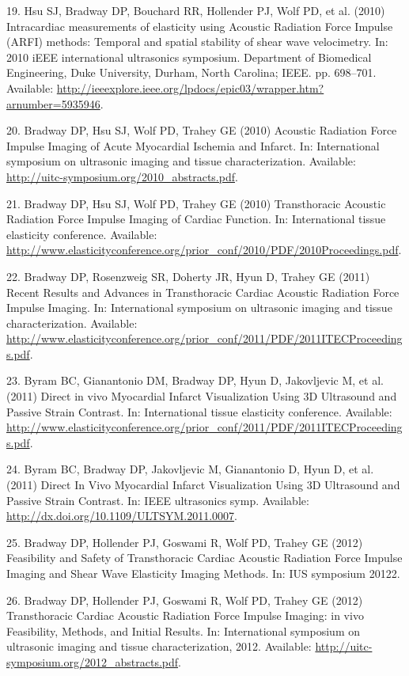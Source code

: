 \documentclass[]{article}
\begin{document}
19. Hsu SJ, Bradway DP, Bouchard RR, Hollender PJ, Wolf PD, et al.
(2010) Intracardiac measurements of elasticity using Acoustic Radiation
Force Impulse (ARFI) methods: Temporal and spatial stability of shear
wave velocimetry. In: 2010 iEEE international ultrasonics symposium.
Department of Biomedical Engineering, Duke University, Durham, North
Carolina; IEEE. pp. 698--701. Available:
\url{http://ieeexplore.ieee.org/lpdocs/epic03/wrapper.htm?arnumber=5935946}.

20. Bradway DP, Hsu SJ, Wolf PD, Trahey GE (2010) Acoustic Radiation
Force Impulse Imaging of Acute Myocardial Ischemia and Infarct. In:
International symposium on ultrasonic imaging and tissue
characterization. Available:
\url{http://uitc-symposium.org/2010_abstracts.pdf}.

21. Bradway DP, Hsu SJ, Wolf PD, Trahey GE (2010) Transthoracic Acoustic
Radiation Force Impulse Imaging of Cardiac Function. In: International
tissue elasticity conference. Available:
\url{http://www.elasticityconference.org/prior_conf/2010/PDF/2010Proceedings.pdf}.

22. Bradway DP, Rosenzweig SR, Doherty JR, Hyun D, Trahey GE (2011)
Recent Results and Advances in Transthoracic Cardiac Acoustic Radiation
Force Impulse Imaging. In: International symposium on ultrasonic imaging
and tissue characterization. Available:
\url{http://www.elasticityconference.org/prior_conf/2011/PDF/2011ITECProceedings.pdf}.

23. Byram BC, Gianantonio DM, Bradway DP, Hyun D, Jakovljevic M, et al.
(2011) Direct in vivo Myocardial Infarct Visualization Using 3D
Ultrasound and Passive Strain Contrast. In: International tissue
elasticity conference. Available:
\url{http://www.elasticityconference.org/prior_conf/2011/PDF/2011ITECProceedings.pdf}.

24. Byram BC, Bradway DP, Jakovljevic M, Gianantonio D, Hyun D, et al.
(2011) Direct In Vivo Myocardial Infarct Visualization Using 3D
Ultrasound and Passive Strain Contrast. In: IEEE ultrasonics symp.
Available: \url{http://dx.doi.org/10.1109/ULTSYM.2011.0007}.

25. Bradway DP, Hollender PJ, Goswami R, Wolf PD, Trahey GE (2012)
Feasibility and Safety of Transthoracic Cardiac Acoustic Radiation Force
Impulse Imaging and Shear Wave Elasticity Imaging Methods. In: IUS
symposium 20122.

26. Bradway DP, Hollender PJ, Goswami R, Wolf PD, Trahey GE (2012)
Transthoracic Cardiac Acoustic Radiation Force Impulse Imaging: in vivo
Feasibility, Methods, and Initial Results. In: International symposium
on ultrasonic imaging and tissue characterization, 2012. Available:
\url{http://uitc-symposium.org/2012_abstracts.pdf}.
\end{document}
